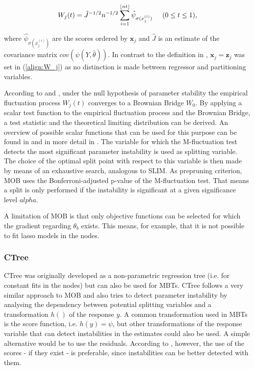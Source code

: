 \begin{align}\label{align:W_j}
    W_{j}(t) = \hat{J}^{-1/2}n^{-1/2}\sum_{i = 1}^{\lfloor nt \rfloor} \hat{\psi}_{\sigma(x_{j}^{(i)})} \hspace{0.5cm} (0 \leq t \leq 1), 
\end{align}

where $\hat{\psi}_{\sigma(x_{j}^{(i)})}$ are the scores ordered by $\mathbf{x}_{j}$ and $\hat{J}$ is an estimate of the covariance matrix $cov(\psi(Y, \hat{\theta}))$. \citep{Zeileis.2008} In contrast to the definition in \citet{Zeileis.2008}, $\textbf{x}_j = \textbf{z}_j$ was set in (\ref{align:W_j}) as no distinction is made between regressor and partitioning variables.




According to \citet{Zeileis.2008} and \citet{Zeileis.2007}, under the null hypothesis of parameter stability the empirical fluctuation process $W_j(t)$ converges to a Brownian Bridge $W_0$. By applying a scalar test function to the empirical fluctuation process and the Brownian Bridge, a test statistic and the theoretical limiting distribution can be derived. An overview of possible scalar functions that can be used for this purpose can be found in \citep{Zeileis.2008} and in more detail in \citep{Zeileis.2007}.
The variable for which the M-fluctuation test detects the most significant parameter instability is used as splitting variable. 
The choice of the optimal split point with respect to this variable is then made by means of an exhaustive search, analogous to SLIM.
As prepruning criterion, MOB uses the Bonferroni-adjusted p-value of the M-fluctuation test. That means a split is only performed if the instability is significant at a given significance level $alpha$.


A limitation of MOB is that only objective functions can be selected for which the gradient regarding $\theta_b$  exists. This means, for example, that it is not possible to fit lasso models in the nodes.




\subsubsection{CTree}
CTree was originally developed as a non-parametric regression tree (i.e. for constant fits in the nodes) but can also be used for MBTs.
CTree follows a very similar approach to MOB and also tries to detect parameter instability by analysing the dependency between potential splitting variables and a transformation $h()$ of the response $y$.
A common transformation used in MBTs is the score function, i.e. $h(y) = \psi$, but other transformations of the response variable that can detect instabilities in the estimates could also be used. A simple alternative would be to use the residuals. According to \citep{Schlosser.2019}, however, the use of the scores - if they exist - is preferable, since instabilities can be better detected with them.


